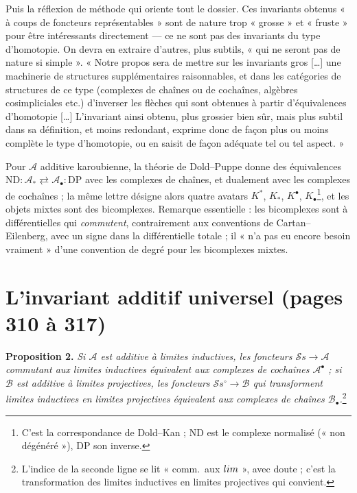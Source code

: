 \documentclass[11pt,a4paper]{article}
\begin{document}
Puis la réflexion de méthode qui oriente tout le dossier. Ces invariants obtenus
« à coups de foncteurs représentables » sont de nature trop « grosse » et
« fruste » pour être intéressants directement — ce ne sont pas des invariants du
type d'homotopie. On devra en extraire d'autres, plus subtils, « qui ne seront
pas de nature si simple ». « Notre propos sera de mettre sur les invariants gros
[\ldots] une machinerie de structures supplémentaires raisonnables, et dans les
catégories de structures de ce type (complexes de chaînes ou de cochaînes,
algèbres cosimpliciales etc.) d'inverser les flèches qui sont obtenues à partir
d'équivalences d'homotopie [\ldots] L'invariant ainsi obtenu, plus grossier bien
sûr, mais plus subtil dans sa définition, et moins redondant, exprime donc de
façon plus ou moins complète le type d'homotopie, ou en saisit de façon
adéquate tel ou tel aspect. »

Pour $\mathcal{A}$ additive karoubienne, la théorie de Dold–Puppe donne des
équivalences $\mathrm{ND} : \mathcal{A}_* \rightleftarrows \mathcal{A}_\bullet
: \mathrm{DP}$ avec les complexes de chaînes, et dualement avec les complexes de
cochaînes ; la même lettre désigne alors quatre avatars $K^*$, $K_*$,
$K^\bullet$, $K_\bullet$\footnote{C'est la correspondance de Dold–Kan ; $\mathrm{ND}$
est le complexe normalisé (« non dégénéré »), $\mathrm{DP}$ son inverse.}, et les
objets mixtes sont des bicomplexes. Remarque essentielle : les bicomplexes sont
à différentielles qui \emph{commutent}, contrairement aux conventions de
Cartan–Eilenberg, avec un signe dans la différentielle totale ; il « n'a pas eu
encore besoin vraiment » d'une convention de degré pour les bicomplexes mixtes.

\section*{L'invariant additif universel (pages 310 à 317)}

\textbf{Proposition 2.} \emph{Si $\mathcal{A}$ est additive à limites
inductives, les foncteurs $\mathcal{S}s \to \mathcal{A}$ commutant aux limites
inductives équivalent aux complexes de cochaînes $\mathcal{A}^\bullet$ ; si
$\mathcal{B}$ est additive à limites projectives, les foncteurs $\mathcal{S}s^\circ
\to \mathcal{B}$ qui transforment limites inductives en limites projectives
équivalent aux complexes de chaînes $\mathcal{B}_\bullet$.}\footnote{L'indice
de la seconde ligne se lit « comm.\ aux $\varinjlim$ », avec doute ; c'est la
transformation des limites inductives en limites projectives qui convient.}
\end{document}
